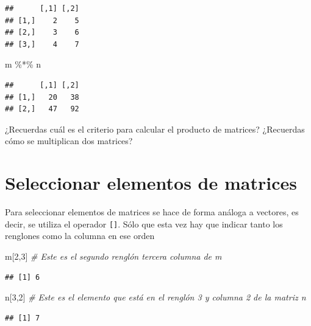 \documentclass[
]{book}
\newenvironment{Shaded}{\begin{snugshade}}{\end{snugshade}}
\newcommand{\CommentTok}[1]{\textcolor[rgb]{0.56,0.35,0.01}{\textit{#1}}}
\newcommand{\DecValTok}[1]{\textcolor[rgb]{0.00,0.00,0.81}{#1}}
\newcommand{\NormalTok}[1]{#1}
\newcommand{\SpecialCharTok}[1]{\textcolor[rgb]{0.00,0.00,0.00}{#1}}
\begin{document}
\begin{verbatim}
##      [,1] [,2]
## [1,]    2    5
## [2,]    3    6
## [3,]    4    7
\end{verbatim}

\begin{Shaded}
\begin{Highlighting}[]
\NormalTok{m }\SpecialCharTok{\%*\%}\NormalTok{ n }
\end{Highlighting}
\end{Shaded}

\begin{verbatim}
##      [,1] [,2]
## [1,]   20   38
## [2,]   47   92
\end{verbatim}

¿Recuerdas cuál es el criterio para calcular el producto de matrices?
¿Recuerdas cómo se multiplican dos matrices?

\hypertarget{seleccionar-elementos-de-matrices}{%
\section{Seleccionar elementos de matrices}\label{seleccionar-elementos-de-matrices}}

Para seleccionar elementos de matrices se hace de forma análoga a vectores, es decir, se utiliza el operador \texttt{{[}{]}}. Sólo que esta vez hay que indicar tanto los renglones como la columna en ese orden

\begin{Shaded}
\begin{Highlighting}[]
\NormalTok{m[}\DecValTok{2}\NormalTok{,}\DecValTok{3}\NormalTok{]  }\CommentTok{\# Este es el segundo renglón tercera columna de m}
\end{Highlighting}
\end{Shaded}

\begin{verbatim}
## [1] 6
\end{verbatim}

\begin{Shaded}
\begin{Highlighting}[]
\NormalTok{n[}\DecValTok{3}\NormalTok{,}\DecValTok{2}\NormalTok{]  }\CommentTok{\# Este es el elemento que está en el renglón 3 y columna 2 de la matriz n }
\end{Highlighting}
\end{Shaded}

\begin{verbatim}
## [1] 7
\end{verbatim}
\end{document}
